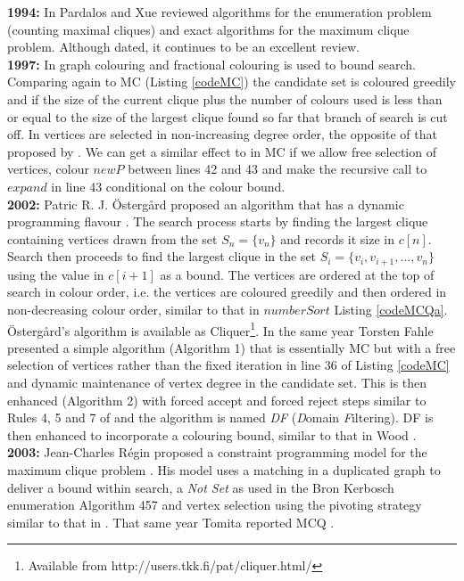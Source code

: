 \documentclass{l4proj}
\begin{document}
\noindent
{\bf 1994:}
In \cite{maxClique} Pardalos and Xue reviewed algorithms for the enumeration problem (counting maximal cliques) 
and exact algorithms for the maximum clique problem. Although dated, it continues to be an excellent review. \\

\noindent
{\bf 1997:}
In \cite{wood97} graph colouring and fractional colouring is used to bound search. Comparing again to MC (Listing \ref{codeMC})
the candidate set is coloured greedily and if the size of the current clique plus the number of colours used is
less than or equal to the size of the largest clique found so far that branch of search is cut off. In \cite{wood97}
vertices are selected in non-increasing degree order, the opposite of that proposed by \cite{pardalosRodgers92}.
We can get a similar effect to \cite{wood97}
in MC if we allow free selection of vertices, colour $newP$ between lines 42 and 43 and make the recursive call to $expand$ in line 43 
conditional on the colour bound.\\

\noindent
{\bf 2002:}
Patric R. J. \"{O}sterg\aa{}rd proposed an algorithm that has a dynamic programming flavour \cite{prjo2002}. The search
process starts by finding the largest clique containing vertices drawn from the set $S_{n} = \{v_{n}\}$ and records it size in $c[n]$. Search
then proceeds to find the largest clique in the set $S_{i} = \{v_{i},v_{i+1},...,v_{n}\}$ using the value in $c[i+1]$ as a bound.
The vertices are ordered at the top of search in colour order, i.e. the vertices are coloured greedily and then ordered
in non-decreasing colour order, similar to that in $numberSort$ Listing \ref{codeMCQa}.
\"{O}sterg\aa{}rd's algorithm is available as Cliquer\footnote{Available from http://users.tkk.fi/pat/cliquer.html/}.
In the same year Torsten Fahle \cite{fahle} presented a simple algorithm (Algorithm 1) that is essentially MC but with a free selection of 
vertices rather than the fixed iteration in line 36 of Listing \ref{codeMC} and dynamic maintenance
of vertex degree in the candidate set. This is then enhanced (Algorithm 2) with forced accept and 
forced reject steps similar to Rules 4, 5 and 7 of \cite{pardalosRodgers92} and the algorithm is named \emph{DF} 
(\emph{D}omain \emph{F}iltering). DF is then enhanced to incorporate a colouring bound, similar to that in Wood \cite{wood97}.\\

\noindent
{\bf 2003:}
Jean-Charles R\'{e}gin proposed a constraint programming model for the maximum clique problem \cite{regin2003}. 
His model uses a matching in a duplicated graph to deliver a bound within search, a \emph{Not Set} as used in the Bron Kerbosch
enumeration Algorithm 457 \cite{bk73} and vertex selection using the pivoting strategy similar to that in 
\cite{bk73,akk73,tomita2006,eppstein2011}. That same year Tomita reported MCQ \cite{tomita2003}.\\
\end{document}
